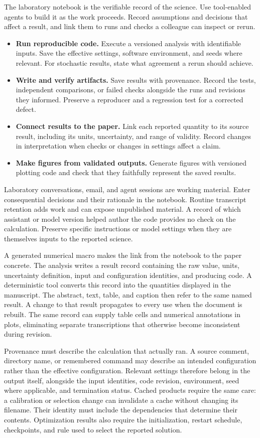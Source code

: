 \documentclass[aps,prd,reprint,nofootinbib]{revtex4-2}
\begin{document}
The laboratory notebook is the verifiable record of the science. Use tool-enabled agents to build it as the work proceeds. Record assumptions and decisions that affect a result, and link them to runs and checks a colleague can inspect or rerun.
\begin{itemize}
\item \textbf{Run reproducible code.} Execute a versioned analysis with identifiable inputs. Save the effective settings, software environment, and seeds where relevant. For stochastic results, state what agreement a rerun should achieve.
\item \textbf{Write and verify artifacts.} Save results with provenance. Record the tests, independent comparisons, or failed checks alongside the runs and revisions they informed. Preserve a reproducer and a regression test for a corrected defect.
\item \textbf{Connect results to the paper.} Link each reported quantity to its source result, including its units, uncertainty, and range of validity. Record changes in interpretation when checks or changes in settings affect a claim.
\item \textbf{Make figures from validated outputs.} Generate figures with versioned plotting code and check that they faithfully represent the saved results.
\end{itemize}
Laboratory conversations, email, and agent sessions are working material. Enter consequential decisions and their rationale in the notebook. Routine transcript retention adds work and can expose unpublished material. A record of which assistant or model version helped author the code provides no check on the calculation. Preserve specific instructions or model settings when they are themselves inputs to the reported science.

A generated numerical macro makes the link from the notebook to the paper concrete. The analysis writes a result record containing the raw value, units, uncertainty definition, input and configuration identities, and producing code. A deterministic tool converts this record into the quantities displayed in the manuscript. The abstract, text, table, and caption then refer to the same named result. A change to that result propagates to every use when the document is rebuilt. The same record can supply table cells and numerical annotations in plots, eliminating separate transcriptions that otherwise become inconsistent during revision.

Provenance must describe the calculation that actually ran. A source comment, directory name, or remembered command may describe an intended configuration rather than the effective configuration. Relevant settings therefore belong in the output itself, alongside the input identities, code revision, environment, seed where applicable, and termination status. Cached products require the same care: a calibration or selection change can invalidate a cache without changing its filename. Their identity must include the dependencies that determine their contents. Optimization results also require the initialization, restart schedule, checkpoints, and rule used to select the reported solution.
\end{document}
